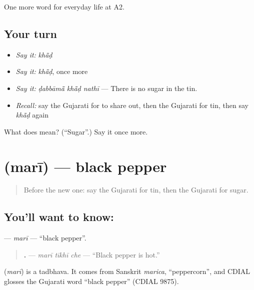 \begin{grammarlens}[title={What you've built}]
One more word for everyday life at A2.
\end{grammarlens}

\subsection*{Your turn}
\begin{itemize}
\raggedright
  \item \emph{Say it:} \emph{khā̃ḍ}
  \item \emph{Say it:} \emph{khā̃ḍ}, once more
  \item \emph{Say it:} \emph{ḍabbāmā̃ khā̃ḍ nathī} — There is no sugar in the tin.
  \item \emph{Recall:} say the Gujarati for to share out, then the Gujarati for tin, then say \emph{khā̃ḍ} again
\end{itemize}

\begin{tcolorbox}[breakable,colback=teal!4,colframe=teal!35!black,title={Before you move on}]
What does  mean? (\textquotedblleft{}Sugar\textquotedblright{}.) Say it once more.
\end{tcolorbox}
\section[\texorpdfstring{\gu{મરી} (marī)}{મરી (marī)}]{ (marī) — black pepper}

\label{lesson:GU-C164-mari}



\begin{quote}
Before the new one: say the Gujarati for tin, then the Gujarati for sugar.
\end{quote}

\subsection*{You'll want to know: }
\textbf{} — \emph{marī} — \textquotedblleft{}black pepper\textquotedblright{}.

\begin{quote}
\textbf{  .} — \emph{marī tīkhī che} — \textquotedblleft{}Black pepper is hot.\textquotedblright{}
\end{quote}

\begin{cousinweb}
\textbf{} (\emph{marī}) is a tadbhava. It comes from Sanskrit \emph{marica}, \textquotedblleft{}peppercorn\textquotedblright{}, and CDIAL glosses the Gujarati word \textquotedblleft{}black pepper\textquotedblright{} (CDIAL 9875).
\end{cousinweb}

